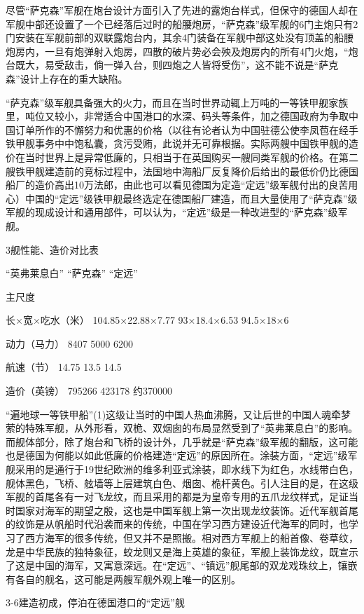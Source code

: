 \documentclass[12pt,UTF8]{ctexbook}
\begin{document}
尽管“萨克森”军舰在炮台设计方面引入了先进的露炮台样式，但保守的德国人却在军舰中部还设置了一个已经落后过时的船腰炮房，“萨克森”级军舰的6门主炮只有2门安装在军舰前部的双联露炮台内，其余4门装备在军舰中部这处没有顶盖的船腰炮房内，一旦有炮弹射入炮房，四散的破片势必会殃及炮房内的所有4门火炮，“炮台既大，易受敌击，倘一弹入台，则四炮之人皆将受伤”，这不能不说是“萨克森”设计上存在的重大缺陷。

“萨克森”级军舰具备强大的火力，而且在当时世界动辄上万吨的一等铁甲舰家族里，吨位又较小，非常适合中国港口的水深、码头等条件，加之德国政府为争取中国订单所作的不懈努力和优惠的价格（以往有论者认为中国驻德公使李凤苞在经手铁甲舰事务中中饱私囊，贪污受贿，此说并无可靠根据。实际两艘中国铁甲舰的造价在当时世界上是异常低廉的，只相当于在英国购买一艘同类军舰的价格。在第二艘铁甲舰建造前的竞标过程中，法国地中海船厂反复降价后给出的最低价仍比德国船厂的造价高出10万法郎，由此也可以看见德国为定造“定远”级军舰付出的良苦用心）中国的“定远”级铁甲舰最终选定在德国船厂建造，而且大量使用了“萨克森”级军舰的现成设计和通用部件，可以认为，“定远”级是一种改进型的“萨克森”级军舰。

3舰性能、造价对比表

“英弗莱息白” “萨克森” “定远”

主尺度

长×宽×吃水（米） 104.85×22.88×7.77 93×18.4×6.53 94.5×18×6

动力（马力） 8407 5000 6200

航速（节） 14.75 13.5 14.5

造价（英镑） 795266 423178 约370000

“遍地球一等铁甲船”(1)这级让当时的中国人热血沸腾，又让后世的中国人魂牵梦萦的特殊军舰，从外形看，双桅、双烟囱的布局显然受到了“英弗莱息白”的影响。而舰体部分，除了炮台和飞桥的设计外，几乎就是“萨克森”级军舰的翻版，这可能也是德国为何能以如此低廉的价格建造“定远”的原因所在。涂装方面，“定远”级军舰采用的是通行于19世纪欧洲的维多利亚式涂装，即水线下为红色，水线带白色，舰体黑色，飞桥、舷墙等上层建筑白色、烟囱、桅杆黄色。引人注目的是，在这级军舰的首尾各有一对飞龙纹，而且采用的都是为皇帝专用的五爪龙纹样式，足证当时国家对海军的期望之殷，这也是中国军舰上第一次出现龙纹装饰。近代军舰首尾的纹饰是从帆船时代沿袭而来的传统，中国在学习西方建设近代海军的同时，也学习了西方海军的很多传统，但又并不是照搬。相对西方军舰上的船首像、卷草纹，龙是中华民族的独特象征，蛟龙则又是海上英雄的象征，军舰上装饰龙纹，既宣示了这是中国的海军，又寓意深远。在“定远”、“镇远”舰尾部的双龙戏珠纹上，镶嵌有各自的舰名，这可能是两艘军舰外观上唯一的区别。

3-6建造初成，停泊在德国港口的“定远”舰
\end{document}
